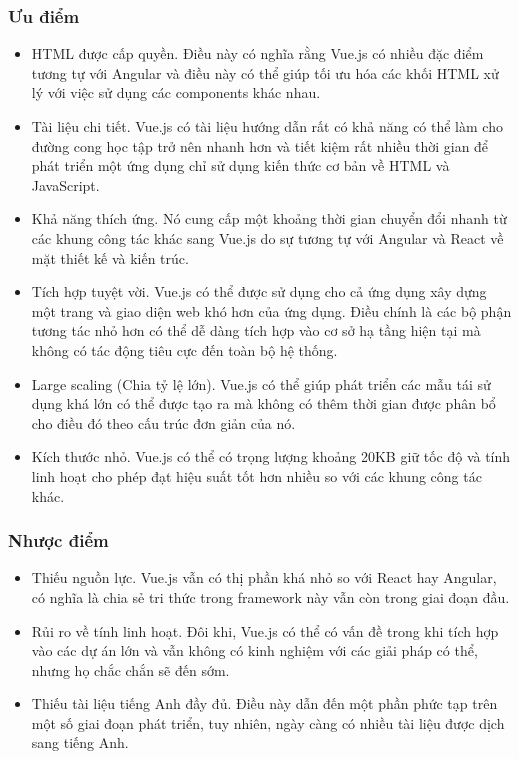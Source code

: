 \documentclass[12pt,a4paper]{report}
\begin{document}
\subsubsection{Ưu điểm}
 \begin{itemize}
		\item HTML được cấp quyền. Điều này có nghĩa rằng Vue.js có nhiều đặc điểm tương tự với Angular và điều này có thể giúp tối ưu hóa các khối HTML xử lý với việc sử dụng các components khác nhau.
		\item Tài liệu chi tiết. Vue.js có tài liệu hướng dẫn rất có khả năng có thể làm cho đường cong học tập trở nên nhanh hơn và tiết kiệm rất nhiều thời gian để phát triển một ứng dụng chỉ sử dụng kiến thức cơ bản về HTML và JavaScript.
		\item 	Khả năng thích ứng. Nó cung cấp một khoảng thời gian chuyển đổi nhanh từ các khung công tác khác sang Vue.js do sự tương tự với Angular và React về mặt thiết kế và kiến trúc.
		\item 	Tích hợp tuyệt vời. Vue.js có thể được sử dụng cho cả ứng dụng xây dựng một trang và giao diện web khó hơn của ứng dụng. Điều chính là các bộ phận tương tác nhỏ hơn có thể dễ dàng tích hợp vào cơ sở hạ tầng hiện tại mà không có tác động tiêu cực đến toàn bộ hệ thống.
		\item 	Large scaling (Chia tỷ lệ lớn). Vue.js có thể giúp phát triển các mẫu tái sử dụng khá lớn có thể được tạo ra mà không có thêm thời gian được phân bổ cho điều đó theo cấu trúc đơn giản của nó.
		\item 	Kích thước nhỏ. Vue.js có thể có trọng lượng khoảng 20KB giữ tốc độ và tính linh hoạt cho phép đạt hiệu suất tốt hơn nhiều so với các khung công tác khác.
	\end{itemize}
\subsubsection{Nhược điểm}
\begin{itemize}
	\item Thiếu nguồn lực. Vue.js vẫn có thị phần khá nhỏ so với React hay Angular, có nghĩa là chia sẻ tri thức trong framework này vẫn còn trong giai đoạn đầu.
	\item Rủi ro về tính linh hoạt. Đôi khi, Vue.js có thể có vấn đề trong khi tích hợp vào các dự án lớn và vẫn không có kinh nghiệm với các giải pháp có thể, nhưng họ chắc chắn sẽ đến sớm.
	\item Thiếu tài liệu tiếng Anh đầy đủ. Điều này dẫn đến một phần phức tạp trên một số giai đoạn phát triển, tuy nhiên, ngày càng có nhiều tài liệu được dịch sang tiếng Anh.
\end{itemize}
\end{document}
